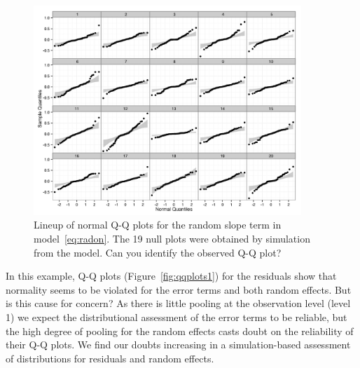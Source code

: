 \documentclass[12pt]{article} %
\newcommand{\al}[1]{{\color{red} #1}}
\begin{document}
\begin{figure}[htb]
	\centering
	\includegraphics[width=0.9\textwidth]{test.jpeg}%
	\caption{\label{fig:lineup} Lineup of normal Q-Q plots for the random slope term in model~\eqref{eq:radon}. The 19 null plots were obtained by simulation from the model. Can you identify the observed Q-Q plot? }
\end{figure}


In this example, Q-Q plots (Figure~\ref{fig:qqplots1}) for the residuals show that normality 
seems to be violated for the error terms and both random effects. But is this cause for concern?
\al{As} there is little pooling at the observation level \al{(level 1)} we expect the distributional assessment of the error terms to be reliable, but  the high degree of pooling  for the random effects  casts doubt on the reliability of their Q-Q plots. 
 We find our doubts increasing in a simulation-based assessment of distributions for residuals and random effects.
\end{document}
